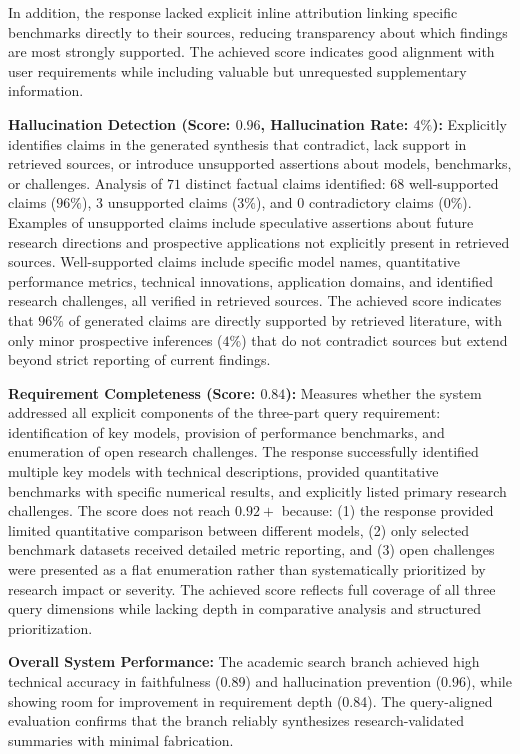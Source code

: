 In addition, the response lacked explicit inline attribution linking specific benchmarks directly to their sources, reducing transparency about which findings are most strongly supported. The achieved score indicates good alignment with user requirements while including valuable but unrequested supplementary information.

\textbf{Hallucination Detection (Score: \( 0.96 \), Hallucination Rate: \( 4\% \)):} Explicitly identifies claims in the generated synthesis that contradict, lack support in retrieved sources, or introduce unsupported assertions about models, benchmarks, or challenges. Analysis of \( 71 \) distinct factual claims identified: \( 68 \) well-supported claims (\( 96\% \)), \( 3 \) unsupported claims (\( 3\% \)), and \( 0 \) contradictory claims (\( 0\% \)). Examples of unsupported claims include speculative assertions about future research directions and prospective applications not explicitly present in retrieved sources. Well-supported claims include specific model names, quantitative performance metrics, technical innovations, application domains, and identified research challenges, all verified in retrieved sources. The achieved score indicates that \( 96\% \) of generated claims are directly supported by retrieved literature, with only minor prospective inferences (\( 4\% \)) that do not contradict sources but extend beyond strict reporting of current findings.

\textbf{Requirement Completeness (Score: \( 0.84 \)):} Measures whether the system addressed all explicit components of the three-part query requirement: identification of key models, provision of performance benchmarks, and enumeration of open research challenges. The response successfully identified multiple key models with technical descriptions, provided quantitative benchmarks with specific numerical results, and explicitly listed primary research challenges. The score does not reach \( 0.92+ \) because: (1) the response provided limited quantitative comparison between different models, (2) only selected benchmark datasets received detailed metric reporting, and (3) open challenges were presented as a flat enumeration rather than systematically prioritized by research impact or severity. The achieved score reflects full coverage of all three query dimensions while lacking depth in comparative analysis and structured prioritization.

\vspace{0.3cm}

\noindent \textbf{Overall System Performance:} The academic search branch achieved high technical accuracy in faithfulness (0.89) and hallucination prevention (0.96), while showing room for improvement in requirement depth (0.84). The query-aligned evaluation confirms that the branch reliably synthesizes research-validated summaries with minimal fabrication.



